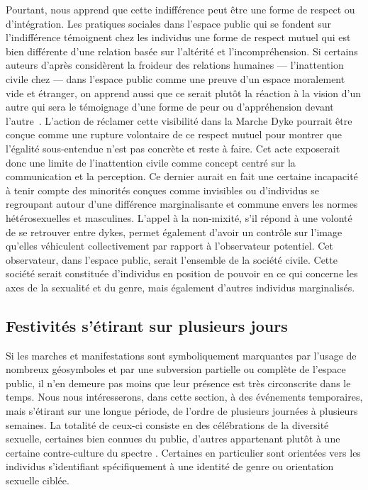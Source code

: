 Pourtant, \citeauthor{Frosh2006} nous apprend que cette indifférence peut être une forme de respect ou d'intégration.
Les pratiques sociales dans l'espace public qui se fondent sur l'indifférence témoignent chez les individus une forme de respect mutuel qui est bien différente d'une relation basée sur l'altérité et l'incompréhension.
Si certains auteurs d'après \citeauthor{Frosh2006} considèrent la froideur des relations humaines --- l'inattention civile chez \citeauthor{Goffman1956} --- dans l'espace public comme une preuve d'un espace moralement vide et étranger, on apprend aussi que ce serait plutôt la réaction à la vision d'un autre qui sera le témoignage d'une forme de peur ou d'appréhension devant l'autre~\citep[279--280]{Frosh2006}.
L'action de réclamer cette visibilité dans la Marche Dyke pourrait être conçue comme une rupture volontaire de ce respect mutuel pour montrer que l'égalité sous-entendue n'est pas concrète et reste à faire.
Cet acte exposerait donc une limite de l'inattention civile comme concept centré sur la communication et la perception.
Ce dernier aurait en fait une certaine incapacité à tenir compte des minorités conçues comme invisibles ou d'individus se regroupant autour d'une différence marginalisante et commune envers les normes hétérosexuelles et masculines.
L'appel à la non-mixité, s'il répond à une volonté de se retrouver entre dykes, permet également d'avoir un contrôle sur l'image qu'elles véhiculent collectivement par rapport à l'observateur potentiel.
Cet observateur, dans l'espace public, serait l'ensemble de la société civile.
Cette société serait constituée d'individus en position de pouvoir en ce qui concerne les axes de la sexualité et du genre, mais également d'autres individus marginalisés.

\subsection{Festivités s'étirant sur plusieurs jours}
\label{sec:festivitesplusieursjours}
Si les marches et manifestations sont symboliquement marquantes par l'usage de nombreux géosymboles et par une subversion partielle ou complète de l'espace public, il n’en demeure pas moins que leur présence est très circonscrite dans le temps.
Nous nous intéresserons, dans cette section, à des événements temporaires, mais s'étirant sur une longue période, de l'ordre de plusieurs journées à plusieurs semaines.
La totalité de ceux-ci consiste en des célébrations de la diversité sexuelle, certaines bien connues du public, d'autres appartenant plutôt à une certaine contre-culture du spectre \lgbt.
Certaines en particulier sont orientées vers les individus s'identifiant spécifiquement à une identité de genre ou orientation sexuelle ciblée.


